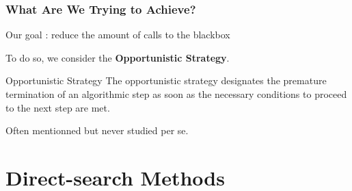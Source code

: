 \documentclass[11pt,utf8,compress]{beamer}
\begin{document}
\begin{frame}%
\frametitle{What Are We Trying to Achieve?}
Our goal : reduce the amount of calls to the blackbox
\pause
\medskip

To do so, we consider the \textbf{Opportunistic Strategy}.

\pause
{\begin{block}{Opportunistic Strategy}
The opportunistic strategy designates the premature termination of an algorithmic step as soon as the necessary conditions to proceed to the next step are met.
\end{block}}
\pause
\medskip
Often mentionned but never studied per se.
\end{frame}
\section{Direct-search Methods}
\tableofcontents[currentsection,currentsubsection,subsectionstyle=show/hide]
\end{document}
